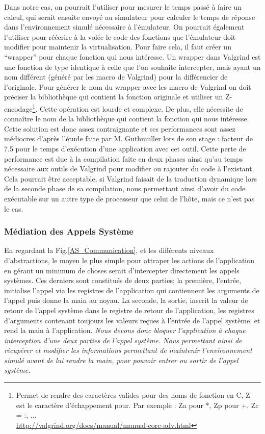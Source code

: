 Dans notre cas, on pourrait l'utiliser pour mesurer le temps passé à faire un
calcul, qui serait ensuite envoyé au simulateur pour calculer le temps de
réponse dans l'environnement simulé nécessaire à l'émulateur. On pourrait
également l'utiliser pour réécrire à la volée le code des fonctions que
l'émulateur doit modifier pour maintenir la virtualisation. Pour faire cela, il
faut créer un ``wrapper'' pour chaque fonction qui nous intéresse. Un wrapper
dans Valgrind est une fonction de type identique à celle que l'on souhaite
intercepter, mais ayant un nom différent (généré par les macro de Valgrind) pour
la différencier de l'originale. Pour générer le nom du wrapper avec les macro de
Valgrind on doit préciser la bibliothèque qui contient la fonction originale et
utiliser un Z-encodage\footnote{ Permet de rendre des caractères valides pour
  des noms de fonction en C, Z est le caractère d'échappement pour. Par exemple
  : Za pour *, Zp pour +, Zc = :,
  ... \\ \url{http://valgrind.org/docs/manual/manual-core-adv.html}}. Cette
opération est lourde et complexe. De plus, elle nécessite de connaître le nom de
la bibliothèque qui contient la fonction qui nous intéresse. Cette solution est
donc assez contraignante et ses performances sont assez médiocres d'après
l'étude faite par M. Guthmuller lors de son stage \citep{MARION:Interception}:
facteur de 7.5 pour le temps d'exécution d'une application avec cet outil. Cette
perte de performance est due à la compilation faite en deux phases ainsi qu'au
temps nécessaire aux outils de Valgrind pour modifier ou rajouter du code à
l'existant. Cela pourrait être acceptable, si Valgrind faisait de la traduction
dynamique lors de la seconde phase de sa compilation, nous permettant ainsi
d'avoir du code exécutable sur un autre type de processeur que celui de l'hôte,
mais ce n'est pas le cas.

\subsubsection{Médiation des Appels Système}

En regardant la Fig.\ref{AS_Communication}, et les différents niveaux
d'abstractions, le moyen le plus simple pour attraper les actions de
l'application en gérant un minimum de choses serait d'intercepter directement
les appels systèmes.  Ces derniers sont constitués de deux parties; la première,
l'entrée, initialise l'appel via les registres de l'application qui contiennent
les arguments de l'appel puis donne la main au noyau. La seconde, la sortie,
inscrit la valeur de retour de l'appel système dans le registre de retour de
l'application, les registres d'arguments contenant toujours les valeurs reçues à
l'entrée de l'appel système, et rend la main à l'application. \textit{Nous
  devons donc bloquer l'application à chaque interception d'une deux parties de
  l'appel système. Nous permettant ainsi de récupérer et modifier les
  informations permettant de maintenir l'environnement simulé avant de lui
  rendre la main, pour pouvoir entrer ou sortir de l'appel système.}

